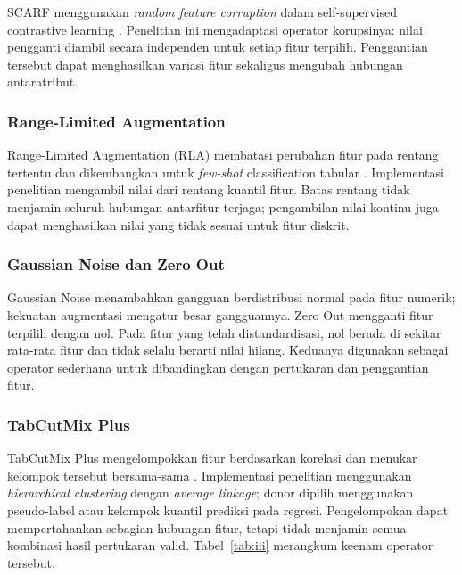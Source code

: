 SCARF menggunakan \textit{random feature corruption} dalam self-supervised contrastive learning \cite{ref7}. Penelitian ini mengadaptasi operator korupsinya: nilai pengganti diambil secara independen untuk setiap fitur terpilih. Penggantian tersebut dapat menghasilkan variasi fitur sekaligus mengubah hubungan antaratribut.

\subsubsection{Range-Limited Augmentation}

Range-Limited Augmentation (RLA) membatasi perubahan fitur pada rentang tertentu dan dikembangkan untuk \textit{few-shot} classification tabular \cite{ref13}. Implementasi penelitian mengambil nilai dari rentang kuantil fitur. Batas rentang tidak menjamin seluruh hubungan antarfitur terjaga; pengambilan nilai kontinu juga dapat menghasilkan nilai yang tidak sesuai untuk fitur diskrit.

\subsubsection{Gaussian Noise dan Zero Out}

Gaussian Noise menambahkan gangguan berdistribusi normal pada fitur numerik; kekuatan augmentasi mengatur besar gangguannya. Zero Out mengganti fitur terpilih dengan nol. Pada fitur yang telah distandardisasi, nol berada di sekitar rata-rata fitur dan tidak selalu berarti nilai hilang. Keduanya digunakan sebagai operator sederhana untuk dibandingkan dengan pertukaran dan penggantian fitur.

\subsubsection{TabCutMix Plus}

TabCutMix Plus mengelompokkan fitur berdasarkan korelasi dan menukar kelompok tersebut bersama-sama \cite{ref12}. Implementasi penelitian menggunakan \textit{hierarchical clustering} dengan \textit{average linkage}; donor dipilih menggunakan pseudo-label atau kelompok kuantil prediksi pada regresi. Pengelompokan dapat mempertahankan sebagian hubungan fitur, tetapi tidak menjamin semua kombinasi hasil pertukaran valid. Tabel~\ref{tab:iii} merangkum keenam operator tersebut.


